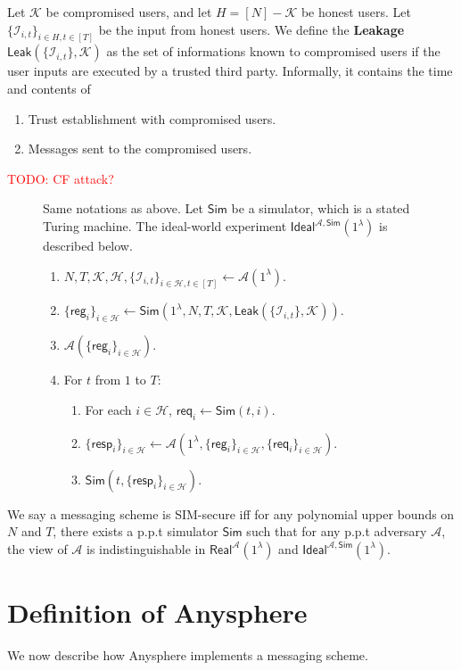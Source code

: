 \documentclass[sigconf, nonacm, balance=false, natbib=false, screen]{acmart}
\newcommand\todo[1]{\textcolor{red}{TODO: #1}}
\newcommand{\reg}{\mathsf{reg}}
\newcommand{\req}{\mathsf{req}}
\newcommand{\resp}{\mathsf{resp}}
\newcommand{\cK}{\mathcal{K}}
\newcommand{\Sim}{\mathsf{Sim}}
\newcommand{\cA}{\mathcal{A}}
\newcommand{\cI}{\mathcal{I}}
\newcommand{\cH}{\mathcal{H}}
\begin{document}
\begin{definition}[Leakage]
Let $\cK$ be compromised users, and let $H = [N] - \cK$ be honest users. Let $\{\cI_{i, t}\}_{i \in H, t \in [T]}$ be the input from honest users. We define the \textbf{Leakage} $\mathsf{Leak}(\{\cI_{i, t}\}, \cK)$ as the set of informations known to compromised users if the user inputs are executed by a trusted third party. Informally, it contains the time and contents of
\begin{enumerate}
    \item Trust establishment with compromised users.
    \item Messages sent to the compromised users.
\end{enumerate}
\todo{CF attack?}
\end{definition}
\begin{figure}[h!]
\begin{framed}
\begin{definition}
Same notations as above. Let $\Sim$ be a simulator, which is a stated Turing machine. The ideal-world experiment $\mathsf{Ideal}^{\cA, \Sim}(1^{\lambda})$ is described below.
\begin{enumerate}
\item $N, T, \cK, \cH, \{\cI_{i, t}\}_{i \in \cH, t \in [T]} \leftarrow \cA(1^{\lambda})$.
\item $\{\reg_i\}_{i \in \cH} \leftarrow \Sim(1^{\lambda}, N, T, \cK, \mathsf{Leak}(\{\cI_{i, t}\}, \cK))$. 
\item $\cA(\{\reg_i\}_{i \in \cH})$.
\item For $t$ from $1$ to $T$:
    \begin{enumerate}
    \item For each $i \in \cH$, $\req_i \leftarrow \Sim(t, i)$.
    
    \item $\{\resp_i\}_{i \in \cH} \leftarrow \cA(1^{\lambda}, \{\reg_i\}_{i \in \cH}, \{\req_i\}_{i \in \cH})$.
    
    \item $\Sim(t, \{\resp_i\}_{i \in \cH})$.
    \end{enumerate}
\end{enumerate}
\end{definition}
\end{framed}
\end{figure}
\begin{definition}
We say a messaging scheme is SIM-secure iff for  any polynomial upper bounds on $N$ and $T$, there exists a p.p.t simulator $\Sim$ such that for any p.p.t adversary $\cA$, the view of $\cA$ is indistinguishable in $\mathsf{Real}^{\cA}(1^{\lambda})$ and $\mathsf{Ideal}^{\cA, \mathsf{\Sim}}(1^{\lambda})$.
\end{definition}

\section{Definition of Anysphere}
We now describe how Anysphere implements a messaging scheme. 
\end{document}

